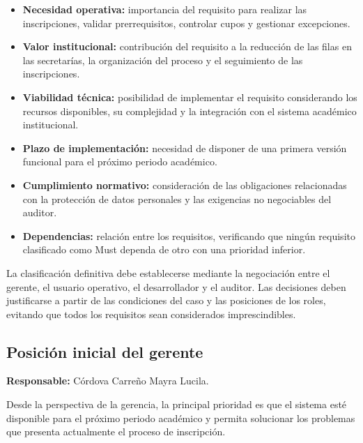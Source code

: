 \documentclass[12pt,a4paper]{article}
\begin{document}
\begin{itemize}[leftmargin=1.5em]

    \item \textbf{Necesidad operativa:} importancia del
    requisito para realizar las inscripciones, validar
    prerrequisitos, controlar cupos y gestionar
    excepciones.

    \item \textbf{Valor institucional:} contribución
    del requisito a la reducción de las filas en las
    secretarías, la organización del proceso y el
    seguimiento de las inscripciones.

    \item \textbf{Viabilidad técnica:} posibilidad de
    implementar el requisito considerando los recursos
    disponibles, su complejidad y la integración con
    el sistema académico institucional.

    \item \textbf{Plazo de implementación:} necesidad
    de disponer de una primera versión funcional para
    el próximo periodo académico.

    \item \textbf{Cumplimiento normativo:} consideración
    de las obligaciones relacionadas con la protección
    de datos personales y las exigencias no negociables
    del auditor.

    \item \textbf{Dependencias:} relación entre los
    requisitos, verificando que ningún requisito
    clasificado como Must dependa de otro con una
    prioridad inferior.

\end{itemize}

La clasificación definitiva debe establecerse mediante
la negociación entre el gerente, el usuario operativo,
el desarrollador y el auditor. Las decisiones deben
justificarse a partir de las condiciones del caso y
las posiciones de los roles, evitando que todos los
requisitos sean considerados imprescindibles.

\subsection{Posición inicial del gerente}

\textbf{Responsable:} Córdova Carreño Mayra Lucila.

Desde la perspectiva de la gerencia, la principal
prioridad es que el sistema esté disponible para el
próximo periodo académico y permita solucionar los
problemas que presenta actualmente el proceso de
inscripción.
\end{document}
